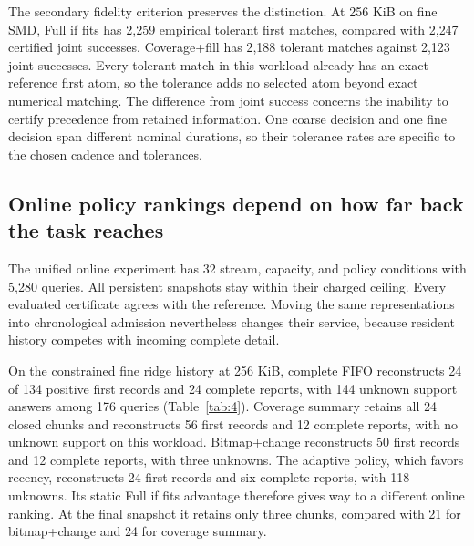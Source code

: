 \documentclass[a4paper,fleqn]{cas-dc}
\begin{document}
The secondary fidelity criterion preserves the distinction. At 256 KiB on fine SMD, Full if fits has 2{,}259 empirical tolerant first matches, compared with 2{,}247 certified joint successes. Coverage+fill has 2{,}188 tolerant matches against 2{,}123 joint successes. Every tolerant match in this workload already has an exact reference first atom, so the tolerance adds no selected atom beyond exact numerical matching. The difference from joint success concerns the inability to certify precedence from retained information. One coarse decision and one fine decision span different nominal durations, so their tolerance rates are specific to the chosen cadence and tolerances.

\subsection{Online policy rankings depend on how far back the task reaches}

The unified online experiment has 32 stream, capacity, and policy conditions with 5{,}280 queries. All persistent snapshots stay within their charged ceiling. Every evaluated certificate agrees with the reference. Moving the same representations into chronological admission nevertheless changes their service, because resident history competes with incoming complete detail.

On the constrained fine ridge history at 256 KiB, complete FIFO reconstructs 24 of 134 positive first records and 24 complete reports, with 144 unknown support answers among 176 queries (Table~\ref{tab:4}). Coverage summary retains all 24 closed chunks and reconstructs 56 first records and 12 complete reports, with no unknown support on this workload. Bitmap+change reconstructs 50 first records and 12 complete reports, with three unknowns. The adaptive policy, which favors recency, reconstructs 24 first records and six complete reports, with 118 unknowns. Its static Full if fits advantage therefore gives way to a different online ranking. At the final snapshot it retains only three chunks, compared with 21 for bitmap+change and 24 for coverage summary.
\end{document}
